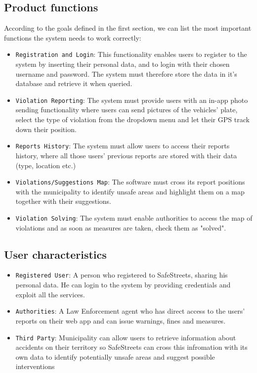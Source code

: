 \documentclass[12pt,a4paper]{article}
\begin{document}
\subsection{Product functions} 
According to the goals defined in the first section, we can list the most important functions the system needs to work correctly:
\begin{itemize}
\item {\texttt{Registration and Login}}: This functionality enables users to register to the system by inserting their personal data, and to login with their chosen username and password. The system must therefore store the data in it's database and retrieve it when queried.  
\item {\texttt{Violation Reporting}}: The system must provide users with an in-app photo sending functionality where users can send pictures of the vehicles' plate, select the type of violation from the dropdown menu and let their GPS track down their position.
\item {\texttt{Reports History}}: The system must allow users to access their reports history, where all those users' previous reports are stored with their data (type, location etc.)
\item {\texttt{Violations/Suggestions Map}}: The software must cross its report positions with the municipality to identify unsafe areas and highlight them on a map together with their suggestions.
\item {\texttt{Violation Solving}}: The system must enable authorities to access the map of violations and as soon as measures are taken, check them as "solved".
\end{itemize}

\newpage

\subsection{User characteristics} 
\begin{itemize}
\item {\texttt{Registered User}}: A person who registered to SafeStreets, sharing his personal data. He can login to the system by providing credentials and exploit all the services.
\item {\texttt{Authorities}}: A Law Enforcement agent who has direct access to the users' reports on their web app and can issue warnings, fines and measures.
\item {\texttt{Third Party}}: Municipality can allow users to retrieve information about accidents on their territory so SafeStreets can cross this infromation with its own data to identify potentially unsafe areas and suggest possible interventions
\end{itemize}
\end{document}
